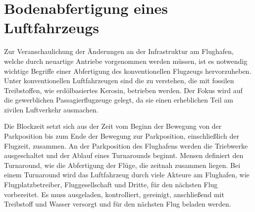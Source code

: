 \section{Bodenabfertigung eines Luftfahrzeugs}
\label{s:Bodenabfertigung eines Luftfahrzeugs}

Zur Veranschaulichung der Änderungen an der Infrastruktur am Flughafen, 
welche durch neuartige Antriebe vorgenommen werden müssen, ist es notwendig 
wichtige Begriffe einer Abfertigung des konventionellen Flugzeugs hervorzuheben. 
Unter konventionellen Luftfahrzeugen sind die zu verstehen,
die mit fossilen Treibstoffen, wie erdölbasiertes Kerosin, betrieben werden. 
Der Fokus wird auf die gewerblichen Passagierflugzeuge gelegt,
da sie einen erheblichen Teil am zivilen Luftverkehr ausmachen. %

Die Blockzeit setzt sich aus der Zeit vom Beginn der Bewegung von der Parkposition 
bis zum Ende der Bewegung zur Parkposition, einschließlich der Flugzeit, zusammen.
An der Parkposition des Flughafens werden die Triebwerke ausgeschaltet 
und der Ablauf eines Turnarounds beginnt. 
Mensen \cite{mensen2013handbuch} definiert den Turnaround, 
wie die Abfertigung der Flüge, die zeitnah zusammen liegen. %
Bei einem Turnaround wird das Luftfahrzeug durch viele Akteure am Flughafen, 
wie Flugplatzbetreiber, Fluggesellschaft und Dritte, für den nächsten Flug vorbereitet. 
Es muss ausgeladen, kontrolliert, gereinigt, anschließend mit Treibstoff und Wasser versorgt %
und für den nächsten Flug beladen werden.\\

